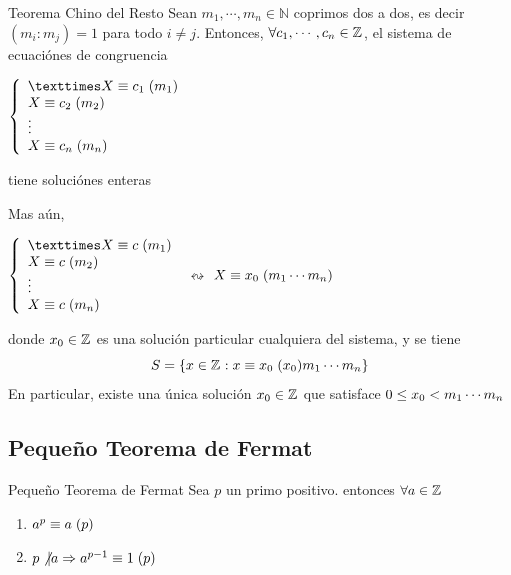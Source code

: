 \documentclass[10pt]{article}
\begin{document}
\begin{teo}{Teorema Chino del Resto}
   Sean $m_1, \cdots , m_n \in \mathbb{N}$ coprimos dos a dos, es decir $(m_i : m_j)=1$ para todo $i \neq j$. Entonces, $\forall c_1, \cdots, c_n \in \mathbb{Z}^{}$, el sistema de ecuaciónes de congruencia
\begin{center}
  $\left\lbrace \begin{array}{l}
                × \congruente{X}{c_1}{m_1} \\
                  \congruente{X}{c_2}{m_2} \\
                  \vdots              \\
                  \congruente{X}{c_n}{m_n}
               \end{array}\right.$ 
  \end{center}
  tiene soluciónes enteras
  
  Mas aún, 
  \begin{center}
  $\left\lbrace \begin{array}{l}
                × \congruente{X}{c}{m_1} \\
                  \congruente{X}{c}{m_2} \\
                  \vdots              \\
                  \congruente{X}{c}{m_n}
               \end{array}\right.$ $\leftrightsquigarrow$ $X \equiv x_0 \hspace{0.1cm} (m_1 \cdots m_n)$
  \end{center}
  donde $x_0 \in \mathbb{Z}^{}$ es una solución particular cualquiera del sistema, y se tiene
  \[S = \{x \in \mathbb{Z}^{} : x \equiv x_0 \hspace{0.1cm} (x_0){m_1 \cdots m_n}\}\]
  En particular, existe una única solución $x_0 \in \mathbb{Z}^{}$ que satisface $0 \leq x_0 < m_1 \cdots m_n$
\end{teo}


\begin{center}
\subsection{Pequeño Teorema de Fermat} 
\end{center}

\begin{teo}{Pequeño Teorema de Fermat}
 Sea $p$ un primo positivo. entonces $\forall a \in \mathbb{Z}^{}$
 \begin{enumerate}
  \item $a^p \equiv a \hspace{0.1cm} (p)$
  \item $p \not\vert a \Rightarrow a^{p-1} \equiv 1 \hspace{0.1cm} (p)$
 \end{enumerate}
\end{teo}
\end{document}
